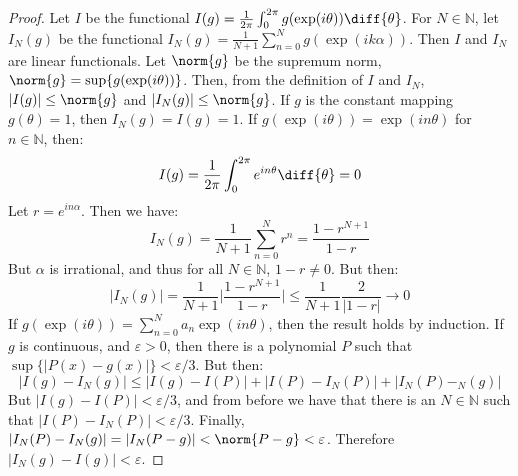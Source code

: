 \documentclass[crop=false,class=book,oneside]{standalone}
\begin{document}
            \begin{proof}
                Let $I$ be the functional
                $I(g)=\frac{1}{2\pi}%
                 \int_{0}^{2\pi}g(\exp(i\theta))\diff{\theta}$.
                For $N\in\mathbb{N}$, let $I_{N}(g)$ be the functional 
                $I_{N}(g)=\frac{1}{N+1}\sum_{n=0}^{N}g(\exp(ik\alpha))$.
                Then $I$ and $I_{N}$ are linear functionals.
                Let $\norm{g}$ be the supremum norm,
                $\norm{g}=\sup\{g(\exp(i\theta))\}$. Then, from the
                definition of $I$ and $I_{N}$,
                $|I(g)|\leq\norm{g}$ and $|I_{N}(g)|\leq\norm{g}$.
                If $g$ is the constant mapping $g(\theta)=1$, then
                $I_{N}(g)=I(g)=1$. If $g(\exp(i\theta))=\exp(in\theta)$
                for $n\in\mathbb{N}$, then:
                \begin{equation*}
                    I(g)
                    =\frac{1}{2\pi}\int_{0}^{2\pi}e^{in\theta}\diff{\theta}
                    =0
                \end{equation*}
                Let $r=e^{in\alpha}$. Then we have:
                \begin{equation*}
                    I_{N}(g)=\frac{1}{N+1}\sum_{n=0}^{N}r^{n}
                    =\frac{1-r^{N+1}}{1-r}
                \end{equation*}
                But $\alpha$ is irrational, and thus for all
                $N\in\mathbb{N}$, $1-r\ne{0}$. But then:
                \begin{equation*}
                    |I_{N}(g)|=\frac{1}{N+1}\Big|\frac{1-r^{N+1}}{1-r}\Big|
                    \leq\frac{1}{N+1}\frac{2}{|1-r|}\rightarrow{0}
                \end{equation*}
                If $g(\exp(i\theta))=\sum_{n=0}^{N}a_{n}\exp(in\theta)$,
                then the result holds by induction. If $g$ is continuous,
                and $\varepsilon>0$, then there is a polynomial
                $P$ such that $\sup\{|P(x)-g(x)|\}<\varepsilon/3$. But then:
                \begin{equation*}
                    |I(g)-I_{N}(g)|\leq|I(g)-I(P)|+|I(P)-I_{N}(P)|+
                    |I_{N}(P)-_{N}(g)|
                \end{equation*}
                But $|I(g)-I(P)|<\varepsilon/3$, and from before we have
                that there is an $N\in\mathbb{N}$ such that
                $|I(P)-I_{N}(P)|<\varepsilon/3$. Finally,
                $|I_{N}(P)-I_{N}(g)|=|I_{N}(P-g)|<\norm{P-g}<\varepsilon$.
                Therefore $|I_{N}(g)-I(g)|<\varepsilon$.
            \end{proof}
\end{document}
